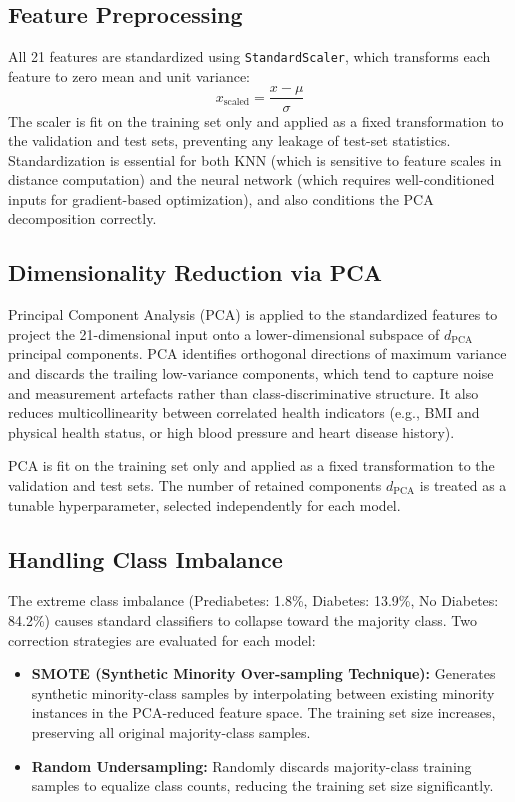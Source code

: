 \documentclass[12pt,a4paper]{article}
\begin{document}
\subsection{Feature Preprocessing}

All 21 features are standardized using \texttt{StandardScaler}, which transforms each feature to zero mean and unit variance:
\begin{equation}
    x_{\text{scaled}} = \frac{x - \mu}{\sigma}
\end{equation}
The scaler is fit on the training set only and applied as a fixed transformation to the validation and test sets, preventing any leakage of test-set statistics. Standardization is essential for both KNN (which is sensitive to feature scales in distance computation) and the neural network (which requires well-conditioned inputs for gradient-based optimization), and also conditions the PCA decomposition correctly.

\subsection{Dimensionality Reduction via PCA}

Principal Component Analysis (PCA) is applied to the standardized features to project the 21-dimensional input onto a lower-dimensional subspace of $d_{\text{PCA}}$ principal components. PCA identifies orthogonal directions of maximum variance and discards the trailing low-variance components, which tend to capture noise and measurement artefacts rather than class-discriminative structure. It also reduces multicollinearity between correlated health indicators (e.g., BMI and physical health status, or high blood pressure and heart disease history).

PCA is fit on the training set only and applied as a fixed transformation to the validation and test sets. The number of retained components $d_{\text{PCA}}$ is treated as a tunable hyperparameter, selected independently for each model.

\subsection{Handling Class Imbalance}

The extreme class imbalance (Prediabetes: 1.8\%, Diabetes: 13.9\%, No Diabetes: 84.2\%) causes standard classifiers to collapse toward the majority class. Two correction strategies are evaluated for each model:

\begin{itemize}
    \item \textbf{SMOTE (Synthetic Minority Over-sampling Technique):} Generates synthetic minority-class samples by interpolating between existing minority instances in the PCA-reduced feature space. The training set size increases, preserving all original majority-class samples.
    \item \textbf{Random Undersampling:} Randomly discards majority-class training samples to equalize class counts, reducing the training set size significantly.
\end{itemize}
\end{document}
